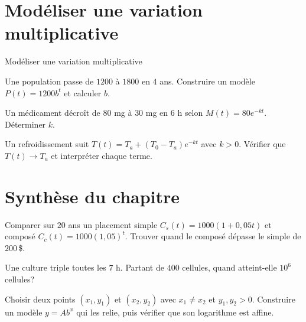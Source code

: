 \section{Modéliser une variation multiplicative}
\label{workbook:section:06.08}
\begin{exerciseblock}{Modéliser une variation multiplicative}
\item Une population passe de $1200$ à $1800$ en $4$ ans. Construire un modèle $P(t)=1200b^t$ et calculer $b$.
\item Un médicament décroît de $80$ mg à $30$ mg en $6$ h selon $M(t)=80e^{-kt}$. Déterminer $k$.
\item Un refroidissement suit $T(t)=T_a+(T_0-T_a)e^{-kt}$ avec $k>0$. Vérifier que $T(t)\to T_a$ et interpréter chaque terme.
\end{exerciseblock}
\section*{Synthèse du chapitre}
\begin{synthesisbox}
\item Comparer sur $20$ ans un placement simple $C_s(t)=1000(1+0{,}05t)$ et composé $C_c(t)=1000(1{,}05)^t$. Trouver quand le composé dépasse le simple de $200\,$\$.
\item Une culture triple toutes les $7$ h. Partant de $400$ cellules, quand atteint-elle $10^6$ cellules?
\item Choisir deux points $(x_1,y_1)$ et $(x_2,y_2)$ avec $x_1\ne x_2$ et $y_1,y_2>0$. Construire un modèle $y=Ab^x$ qui les relie, puis vérifier que son logarithme est affine.
\end{synthesisbox}
